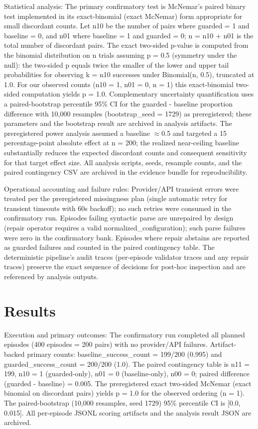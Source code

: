 \documentclass[conference]{IEEEtran}
\begin{document}
Statistical analysis: The primary confirmatory test is McNemar's paired binary test implemented in its exact-binomial (exact McNemar) form appropriate for small discordant counts. Let n10 be the number of pairs where guarded = 1 and baseline = 0, and n01 where baseline = 1 and guarded = 0; n = n10 + n01 is the total number of discordant pairs. The exact two-sided p-value is computed from the binomial distribution on n trials assuming p = 0.5 (symmetry under the null): the two-sided p equals twice the smaller of the lower and upper tail probabilities for observing k = n10 successes under Binomial(n, 0.5), truncated at 1.0. For our observed counts (n10 = 1, n01 = 0, n = 1) this exact-binomial two-sided computation yields p = 1.0. Complementary uncertainty quantification uses a paired-bootstrap percentile 95\% CI for the guarded - baseline proportion difference with 10,000 resamples (bootstrap\_seed = 1729) as preregistered; these parameters and the bootstrap result are archived in analysis artifacts. The preregistered power analysis assumed a baseline \ensuremath{\approx}0.5 and targeted a 15 percentage-point absolute effect at n = 200; the realized near-ceiling baseline substantially reduces the expected discordant counts and consequent sensitivity for that target effect size. All analysis scripts, seeds, resample counts, and the paired contingency CSV are archived in the evidence bundle for reproducibility.

Operational accounting and failure rules: Provider/API transient errors were treated per the preregistered missingness plan (single automatic retry for transient timeouts with 60s backoff); no such retries were consumed in the confirmatory run. Episodes failing syntactic parse are unrepaired by design (repair operator requires a valid normalized\_configuration); such parse failures were zero in the confirmatory bank. Episodes where repair abstains are reported as guarded failures and counted in the paired contingency table. The deterministic pipeline's audit traces (per-episode validator traces and any repair traces) preserve the exact sequence of decisions for post-hoc inspection and are referenced by analysis outputs.

\section{Results}
Execution and primary outcomes: The confirmatory run completed all planned episodes (400 episodes = 200 pairs) with no provider/API failures. Artifact-backed primary counts: baseline\_success\_count = 199/200 (0.995) and guarded\_success\_count = 200/200 (1.0). The paired contingency table is n11 = 199, n10 = 1 (guarded-only), n01 = 0 (baseline-only), n00 = 0; paired difference (guarded - baseline) = 0.005. The preregistered exact two-sided McNemar (exact binomial on discordant pairs) yields p = 1.0 for the observed ordering (n = 1). The paired-bootstrap (10,000 resamples, seed 1729) 95\% percentile CI is [0.0, 0.015]. All per-episode JSONL scoring artifacts and the analysis result JSON are archived.
\end{document}
